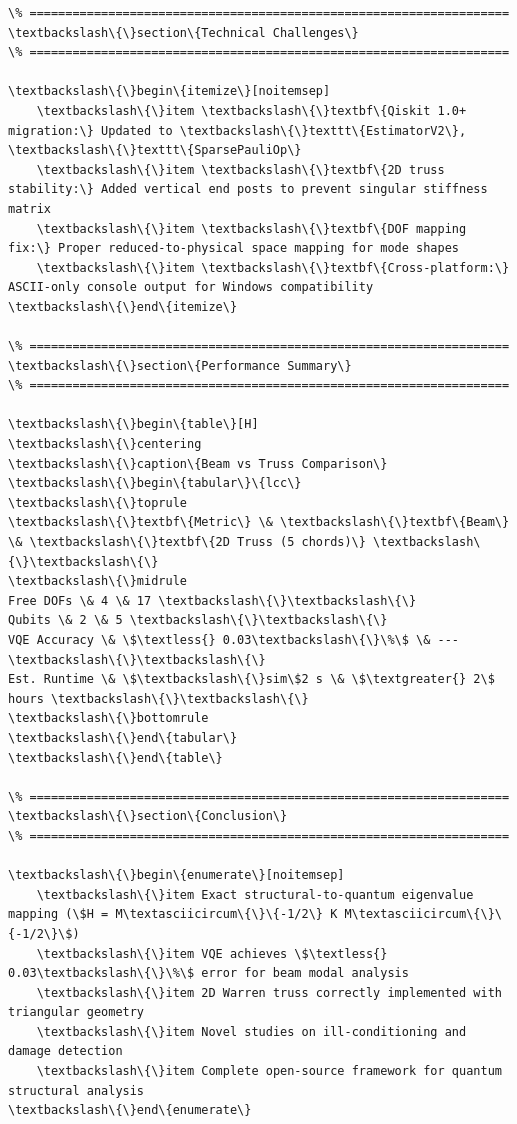 \documentclass[12pt, a4paper]{article}
\begin{document}
\begin{lstlisting}[style=codestyle, caption={VQA\_Modal\_Analysis\_Report.tex}]
\% ===================================================================
\textbackslash\{\}section\{Technical Challenges\}
\% ===================================================================

\textbackslash\{\}begin\{itemize\}[noitemsep]
    \textbackslash\{\}item \textbackslash\{\}textbf\{Qiskit 1.0+ migration:\} Updated to \textbackslash\{\}texttt\{EstimatorV2\}, \textbackslash\{\}texttt\{SparsePauliOp\}
    \textbackslash\{\}item \textbackslash\{\}textbf\{2D truss stability:\} Added vertical end posts to prevent singular stiffness matrix
    \textbackslash\{\}item \textbackslash\{\}textbf\{DOF mapping fix:\} Proper reduced-to-physical space mapping for mode shapes
    \textbackslash\{\}item \textbackslash\{\}textbf\{Cross-platform:\} ASCII-only console output for Windows compatibility
\textbackslash\{\}end\{itemize\}

\% ===================================================================
\textbackslash\{\}section\{Performance Summary\}
\% ===================================================================

\textbackslash\{\}begin\{table\}[H]
\textbackslash\{\}centering
\textbackslash\{\}caption\{Beam vs Truss Comparison\}
\textbackslash\{\}begin\{tabular\}\{lcc\}
\textbackslash\{\}toprule
\textbackslash\{\}textbf\{Metric\} \& \textbackslash\{\}textbf\{Beam\} \& \textbackslash\{\}textbf\{2D Truss (5 chords)\} \textbackslash\{\}\textbackslash\{\}
\textbackslash\{\}midrule
Free DOFs \& 4 \& 17 \textbackslash\{\}\textbackslash\{\}
Qubits \& 2 \& 5 \textbackslash\{\}\textbackslash\{\}
VQE Accuracy \& \$\textless{} 0.03\textbackslash\{\}\%\$ \& --- \textbackslash\{\}\textbackslash\{\}
Est. Runtime \& \$\textbackslash\{\}sim\$2 s \& \$\textgreater{} 2\$ hours \textbackslash\{\}\textbackslash\{\}
\textbackslash\{\}bottomrule
\textbackslash\{\}end\{tabular\}
\textbackslash\{\}end\{table\}

\% ===================================================================
\textbackslash\{\}section\{Conclusion\}
\% ===================================================================

\textbackslash\{\}begin\{enumerate\}[noitemsep]
    \textbackslash\{\}item Exact structural-to-quantum eigenvalue mapping (\$H = M\textasciicircum\{\}\{-1/2\} K M\textasciicircum\{\}\{-1/2\}\$)
    \textbackslash\{\}item VQE achieves \$\textless{} 0.03\textbackslash\{\}\%\$ error for beam modal analysis
    \textbackslash\{\}item 2D Warren truss correctly implemented with triangular geometry
    \textbackslash\{\}item Novel studies on ill-conditioning and damage detection
    \textbackslash\{\}item Complete open-source framework for quantum structural analysis
\textbackslash\{\}end\{enumerate\}


\end{lstlisting}
\end{document}
